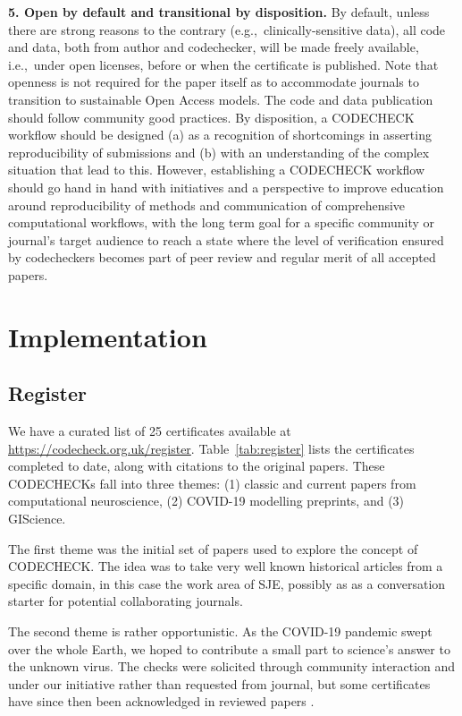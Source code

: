 \documentclass[12pt]{article}
\begin{document}
\textbf{5. Open by default and transitional by disposition.} %
By default, unless there are strong
reasons to the contrary (e.g.,~clinically-sensitive data), all code and
data, both from author and codechecker, will be made freely available, 
i.e.,~under open licenses, before or when the certificate is published.
Note that openness is not required for the paper itself as to accommodate 
journals to transition to sustainable Open Access models.
The code and data publication should follow community good practices.
By disposition, a CODECHECK workflow should be designed (a) as a recognition of
shortcomings in asserting reproducibility of submissions and (b)
with an understanding of the
complex situation that lead to this. However, establishing a CODECHECK workflow
should go hand in hand with initiatives and a perspective to improve education
around reproducibility of methods and communication of comprehensive 
computational workflows, with the long term goal for a specific community or
journal's target audience to reach a state where the level of verification 
ensured by codecheckers becomes part of peer review and regular
merit of all accepted papers.

\section*{Implementation}\label{implementation}

\subsection*{Register}\label{register}

We have a curated list of 25 certificates available at
\url{https://codecheck.org.uk/register}.
Table~\ref{tab:register} lists the certificates completed to date,
along with citations to the original papers.
These CODECHECKs fall into three themes:
(1) classic and current papers from computational neuroscience,
(2) COVID-19 modelling preprints, and
(3) GIScience.  

The first theme was the initial set of papers used to explore the concept
of CODECHECK. 
The idea was to take very well known historical articles from a 
specific domain, in this case the work area of SJE, possibly 
as as a conversation starter for potential collaborating journals.

The second theme is rather opportunistic. As the COVID-19 pandemic swept
over the whole Earth, we hoped to contribute a small part to science's answer
to the unknown virus. The checks were solicited through community interaction
and under our initiative rather than requested from journal, but some certificates
have since then been acknowledged in reviewed papers
\cite{Davies2020-vj,kucharski_effectiveness_2020}.
\end{document}
